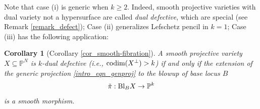 \documentclass[12pt]{amsart}
\newtheorem{corollary}[theorem]{Corollary}
\begin{document}
Note that case (i) is generic when $k\ge 2$. Indeed, smooth projective varieties with dual variety not a hypersurface are called \textit{dual defective}, which are special (see Remark \ref{remark_defect}); Case (ii) generalizes Lefschetz pencil in $k=1$; Case (iii) has the following application:%








\begin{corollary}[Corollary \ref{cor_smooth-fibration}]\label{intro_cor_smoothfib}
 A smooth projective variety $X\subseteq \mathbb P^N$ is $k$-dual defective (i.e., $\textup{codim}(X^{\perp})>k$) if and only if the extension of the generic projection \eqref{intro_eqn_genproj} to the blowup of base locus $B$
$$\tilde{\pi}:\textup{Bl}_BX\to \mathbb P^k$$
is a smooth morphism. %
\end{corollary}
\end{document}
